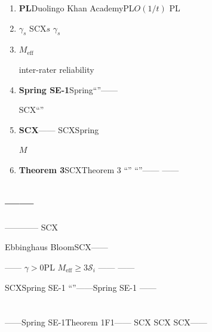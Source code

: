 \documentclass[11pt,a4paper]{article}
\theoremstyle{remark}
\newcommand{\Sstates}{\mathcal{S}}
\begin{document}
\begin{enumerate}[label=(\arabic*), leftmargin=*]

    \item \textbf{PL}Duolingo
          Khan AcademyPL$O(1/t)$
          PL

    \item \textbf{$\gamma_s$}
          SCX$s$
          $\gamma_s$

    \item \textbf{$M_{\text{eff}}$}
          
          inter-rater reliability

    \item \textbf{Spring SE-1}Spring``''——
          
          
          SCX``''

    \item \textbf{SCX}——
          SCXSpring
          
          $M$

    \item \textbf{Theorem 3}SCXTheorem 3
          ``''
          ``''——
          ——

\end{enumerate}

\subsection{——}

————
SCX\textbf{}\textbf{}

\textbf{}Ebbinghaus
BloomSCX——


\textbf{}——
$\gamma > 0$PL
$M_{\text{eff}} \geq 3$$\Sstates_i$
——\textbf{}
——

\textbf{}\textbf{}
\textbf{}
SCX\textbf{}Spring SE-1\textbf{}
``''——Spring SE-1
——

\section*{}

——Spring SE-1Theorem 1F1——
SCX\cite{scx2026theorems,scx2026cc_audit,scx2026spring_convergence,scx2026spring_hostile}
SCX
SCX\cite{scx2026spring_hostile}——
\end{document}
